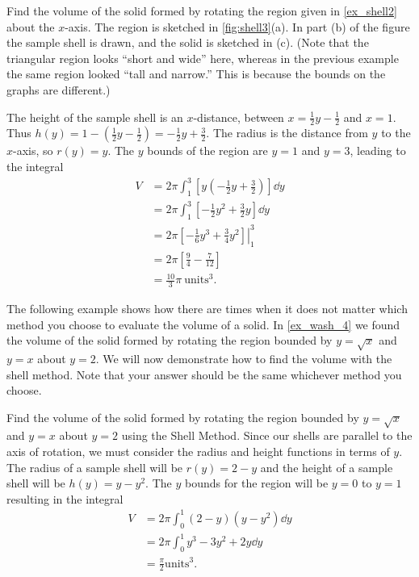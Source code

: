 \begin{example}\label{ex_shell3}%
Find the volume of the solid formed by rotating the region given in \autoref{ex_shell2} about the $x$-axis.
\solution
The region is sketched in \autoref{fig:shell3}(a). In part (b) of the figure the sample shell is drawn, and the solid is sketched in (c). (Note that the triangular region looks ``short and wide'' here, whereas in the previous example the same region looked ``tall and narrow.'' This is because the bounds on the graphs are different.)

The height of the sample shell is an $x$-distance, between $x=\frac12y-\frac12$ and $x=1$. Thus $h(y) = 1-(\frac12y-\frac12) = -\frac12y+\frac32.$ The radius is the distance from $y$ to the $x$-axis, so $r(y) =y$. The $y$ bounds of the region are $y=1$ and $y=3$, leading to the integral
\begin{align*}
V &= 2\pi\int_1^3\left[y\left(-\frac12y+\frac32\right)\right]\dd y \\
	&= 2\pi\int_1^3\left[-\frac12y^2+\frac32y\right]\dd y \\
	&= 2\pi\left.\left[-\frac16y^3+\frac34y^2\right]\right|_1^3 \\
	&= 2\pi\left[\frac94-\frac7{12}\right]\\
	&=	\frac{10}{3}\pi %
	\ \text{units}^3.
\end{align*}
\end{example}

The following example shows how there are times when it does not matter which method you choose to evaluate the volume of a solid. In \autoref{ex_wash_4} we found the volume of the solid formed by rotating the region bounded by $y=\sqrt x$ and $y=x$ about $y=2$. We will now demonstrate how to find the volume with the shell method. Note that your answer should be the same whichever method you choose.

\begin{example}\label{ex_shell_wash_eq}%
Find the volume of the solid formed by rotating the region bounded by $y=\sqrt x$ and $y=x$ about $y=2$ using the Shell Method.
\solution
Since our shells are parallel to the axis of rotation, we must consider the radius and height functions in terms of $y$. The radius of a sample shell will be $r(y)=2-y$ and the height of a sample shell will be $h(y)=y-y^2$. The $y$ bounds for the region will be $y=0$ to $y=1$ resulting in the integral
\begin{align*}
V&=2\pi \int_0^1 (2-y)(y-y^2)\dd y\\
&=2\pi\int_0^1 y^3-3y^2+2y\dd y\\
&=\frac{\pi}{2} \text{units}^3.
\end{align*}
\end{example}

